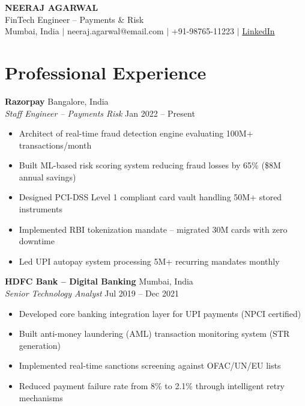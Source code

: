 \documentclass[11pt,letterpaper]{article}
\begin{document}
\begin{center}
{\Large\bfseries\color{banknavy} NEERAJ AGARWAL}\\[4pt]
{\normalsize FinTech Engineer -- Payments \& Risk}\\[6pt]
{\small Mumbai, India \quad $\vert$ \quad neeraj.agarwal@email.com \quad $\vert$ \quad +91-98765-11223 \quad $\vert$ \quad \href{https://linkedin.com/in/neeraja}{LinkedIn}}
\end{center}

\vspace{4pt}
\noindent{}

\section{Professional Experience}

\textbf{Razorpay} \hfill Bangalore, India\\
\textit{Staff Engineer -- Payments Risk} \hfill Jan 2022 -- Present
\begin{itemize}
\item Architect of real-time fraud detection engine evaluating 100M+ transactions/month
\item Built ML-based risk scoring system reducing fraud losses by 65\% (\$8M annual savings)
\item Designed PCI-DSS Level 1 compliant card vault handling 50M+ stored instruments
\item Implemented RBI tokenization mandate -- migrated 30M cards with zero downtime
\item Led UPI autopay system processing 5M+ recurring mandates monthly
\end{itemize}

\textbf{HDFC Bank -- Digital Banking} \hfill Mumbai, India\\
\textit{Senior Technology Analyst} \hfill Jul 2019 -- Dec 2021
\begin{itemize}
\item Developed core banking integration layer for UPI payments (NPCI certified)
\item Built anti-money laundering (AML) transaction monitoring system (STR generation)
\item Implemented real-time sanctions screening against OFAC/UN/EU lists
\item Reduced payment failure rate from 8\% to 2.1\% through intelligent retry mechanisms
\end{itemize}
\end{document}
